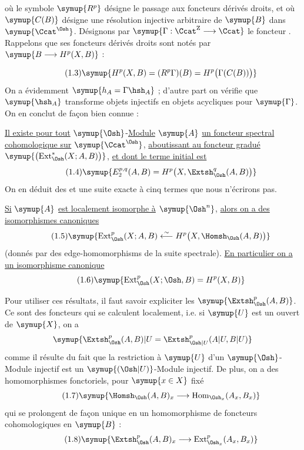 où le symbole $\symup{R^{p}}$ désigne le passage aux foncteurs dérivés droits, et où
$\symup{C(B)}$ désigne une résolution injective arbitraire de $\symup{B}$ dans $\symup{\Ccat^{\Osh}}$.
Désignons par
$\symup{\Gamma:\Ccat^{\mathrm Z}\longrightarrow\Ccat}$ le foncteur . Rappelons que ses foncteurs dérivés droits sont
notés par $\symup{B\longrightarrow H^{p}(X,B)}$ :


\begin{equation}\tag{1.3}
  \symup{H^{p}(X,B)=(R^{p}\Gamma)(B)=H^{p}\bigl(\Gamma(C(B))\bigr)}
\end{equation}
On a évidemment $\symup{h_A=\Gamma\hsh_A}$ ; d'autre part on vérifie que $\symup{\hsh_A}$
transforme objets injectifs en objets acycliques pour $\symup{\Gamma}$. On en conclut de
façon bien connue :

 \uline{Il existe pour tout} $\symup{\Osh}$-\uline{Module} $\symup{A}$ \uline{un foncteur
spectral cohomologique sur} $\symup{\Ccat^{\Osh}}$, \uline{aboutissant au foncteur gradué}
$\symup{\bigl(\operatorname{Ext}_{\Osh}^{*}(X;A,B)\bigr)}$, \uline{et dont le terme initial est}
\begin{equation}\tag{1.4}
  \symup{E_{2}^{p,q}(A,B)=H^{p}\bigl(X,\Extsh_{\Osh}^{q}(A,B)\bigr)}
\end{equation}
On en déduit des  et une suite exacte à cinq termes
que nous n'écrirons pas.

 \uline{Si} $\symup{A}$ \uline{est localement isomorphe à} $\symup{\Osh^{n}}$, \uline{alors on a
des isomorphismes canoniques}
\begin{equation}\tag{1.5}
  \symup{\operatorname{Ext}_{\Osh}^{p}(X;A,B)
  \overset{\sim}{\longleftarrow}
  H^{p}\bigl(X,\Homsh_{\Osh}(A,B)\bigr)}
\end{equation}
(donnés par des edge-homomorphisms de la suite spectrale). \uline{En particulier on a
un isomorphisme canonique}
\begin{equation}\tag{1.6}
  \symup{\operatorname{Ext}_{\Osh}^{p}(X;\Osh,B)=H^{p}(X,B)}
\end{equation}

Pour utiliser ces résultats, il faut savoir expliciter les
$\symup{\Extsh_{\Osh}^{p}(A,B)}$. Ce sont des foncteurs qui se calculent localement,
i.e. si $\symup{U}$ est un ouvert de $\symup{X}$, on a
\[
  \symup{\Extsh_{\Osh}^{p}(A,B)|U
  =\Extsh_{\Osh|U}^{p}(A|U,B|U)}
\]
comme il résulte du fait que la restriction à $\symup{U}$ d'un $\symup{\Osh}$-Module injectif
est un $\symup{(\Osh|U)}$-Module injectif. De plus, on a des homomorphismes fonctoriels,
pour $\symup{x\in X}$ fixé
\begin{equation}\tag{1.7}
  \symup{\Homsh_{\Osh}(A,B)_x
  \longrightarrow
  \operatorname{Hom}_{\Osh_x}(A_x,B_x)}
\end{equation}
qui se prolongent de façon unique en un homomorphisme de foncteurs cohomologiques
en $\symup{B}$ :
\begin{equation}\tag{1.8}
  \symup{\Extsh_{\Osh}^{p}(A,B)_x
  \longrightarrow
  \operatorname{Ext}_{\Osh_x}^{p}(A_x,B_x)}
\end{equation}

